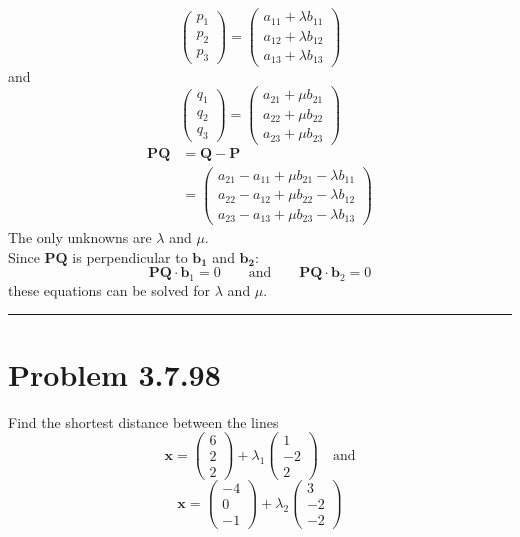 \documentclass[12pt]{article}
\newcommand{\myvec}[1]{\ensuremath{\begin{pmatrix}#1\end{pmatrix}}} %
\begin{document}
\noindent
\begin{equation}
\begin{pmatrix}
	p_{1} \\
	p_{2} \\
	p_{3}
\end{pmatrix}
	=
\begin{pmatrix}
	a_{11} + \lambda b_{11} \\
	a_{12} + \lambda b_{12} \\
	a_{13} + \lambda b_{13}
\end{pmatrix}
\end{equation}
	and
\begin{equation}
\begin{pmatrix}
	q_{1} \\
	q_{2} \\
	q_{3}
\end{pmatrix}
	=
\begin{pmatrix}
	a_{21} + \mu b_{21} \\
	a_{22} + \mu b_{22} \\
	a_{23} + \mu b_{23}
\end{pmatrix}
\end{equation}
\begin{align}
	\mathbf{PQ} &= \mathbf{Q} - \mathbf{P} 	\nonumber \\
		&=
\begin{pmatrix}
	a_{21} - a_{11} + \mu b_{21} - \lambda b_{11} \\
	a_{22} - a_{12} + \mu b_{22} - \lambda b_{12} \\
	a_{23} - a_{13} + \mu b_{23} - \lambda b_{13}
\end{pmatrix}
\end{align}
The only unknowns are $\lambda$ and $\mu$. \\

\noindent
Since $\mathbf{PQ}$ is perpendicular to $\mathbf{b_1}$ and $\mathbf{b_2}$:
\begin{equation}
	\mathbf{PQ} \cdot \mathbf{b}_1 = 0 \qquad \text{and} \qquad
	\mathbf{PQ} \cdot \mathbf{b}_2 = 0
\end{equation}
these equations can be solved for $\lambda$ and $\mu$.\\

\hrule
\section*{Problem 3.7.98}
Find the shortest distance between the lines
\begin{equation*}
	\mathbf{x} = \myvec{6\\2\\2} + \lambda_1 \myvec{1\\-2\\2} \quad \text{and} 
\end{equation*}
\begin{equation*}
	 \mathbf{x} = \myvec{-4\\0\\-1} + \lambda_2 \myvec{3\\-2\\-2}
\end{equation*}
\end{document}
